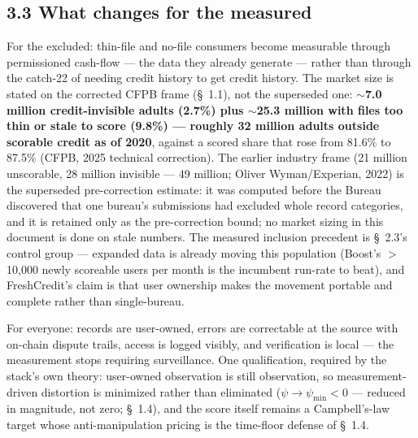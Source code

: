 \documentclass[
]{article}
\begin{document}
\subsection{3.3 What changes for the
measured}\label{what-changes-for-the-measured}

For the excluded: thin-file and no-file consumers become measurable
through permissioned cash-flow --- the data they already generate ---
rather than through the catch-22 of needing credit history to get credit
history. The market size is stated on the corrected CFPB frame (§~1.1),
not the superseded one: \textbf{\(\sim\)7.0 million credit-invisible
adults (2.7\%) plus \(\sim\)25.3 million with files too thin or stale to
score (9.8\%) --- roughly 32 million adults outside scorable credit as
of 2020}, against a scored share that rose from 81.6\% to 87.5\% (CFPB,
2025 technical correction). The earlier industry frame (21 million
unscorable, 28 million invisible --- 49 million; Oliver Wyman/Experian,
2022) is the superseded pre-correction estimate: it was computed before
the Bureau discovered that one bureau's submissions had excluded whole
record categories, and it is retained only as the pre-correction bound;
no market sizing in this document is done on stale numbers. The measured
inclusion precedent is §~2.3's control group --- expanded data is
already moving this population (Boost's \(>\)10,000 newly scoreable
users per month is the incumbent run-rate to beat), and FreshCredit's
claim is that user ownership makes the movement portable and complete
rather than single-bureau.

For everyone: records are user-owned, errors are correctable at the
source with on-chain dispute trails, access is logged visibly, and
verification is local --- the measurement stops requiring surveillance.
One qualification, required by the stack's own theory: user-owned
observation is still observation, so measurement-driven distortion is
minimized rather than eliminated (\(\psi \rightarrow \psi_{\min} < 0\)
--- reduced in magnitude, not zero; §~1.4), and the score itself remains
a Campbell's-law target whose anti-manipulation pricing is the
time-floor defense of §~1.4.
\end{document}
